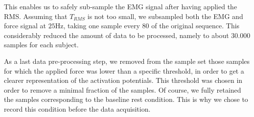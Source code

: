 
This enables us to safely sub-sample the EMG signal after having
applied the RMS. Assuming that $T_{RMS}$ is not too small, we
subsampled both the EMG and force signal at $25$Hz, taking one sample
every $80$ of the original sequence.  This considerably reduced the
amount of data to be processed, namely to about $30.000$ samples for
each subject.

As a last data pre-processing step, we removed from the sample set
those samples for which the applied force was lower than a specific
threshold, in order to get a clearer representation of the activation
potentials. This threshold was chosen in order to remove a minimal
fraction of the samples. Of course, we fully retained the samples
corresponding to the baseline rest condition.  This is why we chose to
record this condition before the data acquisition.
